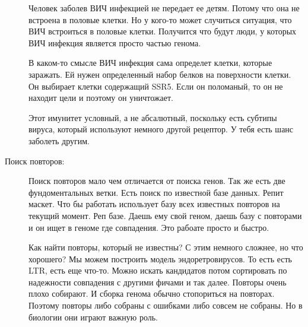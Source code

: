 \begin{description}
Человек заболев ВИЧ инфекцией не передает ее детям. Потому что она не встроена в половые клетки. 
Но у кого-то может случиться ситуация, что ВИЧ встроиться в половые клетки. Получится что будут 
люди, у которых ВИЧ инфекция является просто частью генома. 

В каком-то смысле ВИЧ инфекция сама определет клетки, которые заражать. Ей нужен определенный 
набор белков на поверхности клетки. Он выбирает клетки содержащий SSR5. Если он поломаный, то 
он не находит цели и поэтому он уничтожает. 

Этот имунитет условный, а не абсалютный, поскольку есть субтипы вируса, который используют 
немного другой рецептор. У тебя есть шанс заболеть другим. 

\item[Поиск повторов:]
Поиск повторов мало чем отличается от поиска генов. Так же есть две фундоментальных ветки. 
Есть поиск по известной базе данных. Репит маскет. Что бы работать использует базу 
всех известных повторов на текущий момент. Реп базе. Даешь ему свой геном, даешь 
базу с повторами и он ищет в геноме где совпадения. Это рабоате просто и быстро. 

Как найти повторы, который не известны? С этим немного сложнее, но что хорошего? 
Мы можем построить модель эндоретровирусов. То есть есть LTR, есть еще что-то. Можно 
искать кандидатов потом сортировать по надежности совпадения с другими фичами и так далее. 
Повторы очень плохо собирают. И сборка генома обычно стопориться на повторах. Поэтому 
повторы либо собраны с ошибками либо совсем не собраны. Но в биологии они играют важную роль. 
\end{description}